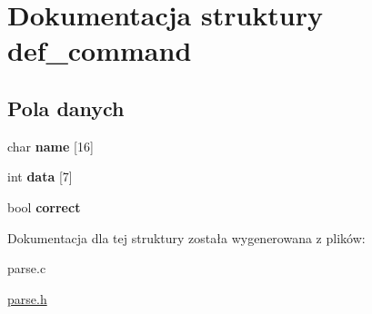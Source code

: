 \hypertarget{structdef__command}{\section{Dokumentacja struktury def\-\_\-command}
\label{structdef__command}
}
\subsection*{Pola danych}
\begin{DoxyCompactItemize}
\item 
\hypertarget{structdef__command_af8fb01ba8e40c37b8a2e94e77fcc52fb}{char {\bfseries name} \mbox{[}16\mbox{]}}\label{structdef__command_af8fb01ba8e40c37b8a2e94e77fcc52fb}

\item 
\hypertarget{structdef__command_a8894767984f2875f9cbcde28a9d2658a}{int {\bfseries data} \mbox{[}7\mbox{]}}\label{structdef__command_a8894767984f2875f9cbcde28a9d2658a}

\item 
\hypertarget{structdef__command_a0ce0204aa4be8cdd8d04b8bbffbe9b31}{bool {\bfseries correct}}\label{structdef__command_a0ce0204aa4be8cdd8d04b8bbffbe9b31}

\end{DoxyCompactItemize}


Dokumentacja dla tej struktury została wygenerowana z plików\-:\begin{DoxyCompactItemize}
\item 
parse.\-c\item 
\hyperlink{parse_8h}{parse.\-h}\end{DoxyCompactItemize}
